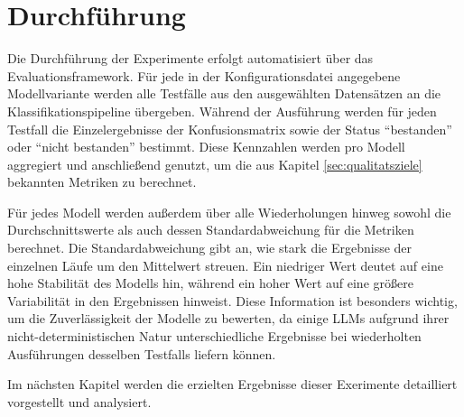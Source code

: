 \section{Durchführung}\label{sec:durchfuhrung}

Die Durchführung der Experimente erfolgt automatisiert über das Evaluationsframework.  Für jede in der Konfigurationsdatei angegebene Modellvariante werden alle Testfälle aus den ausgewählten Datensätzen an die Klassifikationspipeline übergeben. Während der Ausführung werden für jeden Testfall die Einzelergebnisse der Konfusionsmatrix sowie der Status \enquote{bestanden} oder \enquote{nicht bestanden} bestimmt. Diese Kennzahlen werden pro Modell aggregiert und anschließend genutzt, um die aus Kapitel \ref{sec:qualitatsziele} bekannten Metriken zu berechnet.

Für jedes Modell werden außerdem über alle Wiederholungen hinweg sowohl die Durchschnittswerte als auch dessen Standardabweichung für die Metriken berechnet. Die Standardabweichung gibt an, wie stark die Ergebnisse der einzelnen Läufe um den Mittelwert streuen. Ein niedriger Wert deutet auf eine hohe Stabilität des Modells hin, während ein hoher Wert auf eine größere Variabilität in den Ergebnissen hinweist. Diese Information ist besonders wichtig, um die Zuverlässigkeit der Modelle zu bewerten, da einige \acp{LLM} aufgrund ihrer nicht-deterministischen Natur unterschiedliche Ergebnisse bei wiederholten Ausführungen desselben Testfalls liefern können.

Im nächsten Kapitel werden die erzielten Ergebnisse dieser Exerimente detailliert vorgestellt und analysiert.
